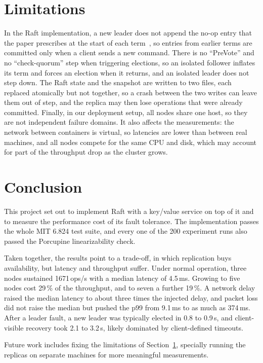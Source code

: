 \documentclass[conference]{IEEEtran}
\begin{document}
\section{Limitations}\label{sec:limits}
In the Raft implementation, a new leader does not append the no-op entry that the paper prescribes at the start of each term~\cite{raft2014},
so entries from earlier terms are committed only when a client sends a new command. There is no ``PreVote'' and no ``check-quorum'' step when triggering elections,
so an isolated follower inflates its term and forces an election when it returns, and an isolated leader does not step down. The Raft state and the snapshot are written to two files,
each replaced atomically but not together, so a crash between the two writes can leave them out of step, and the replica may then lose operations that were already committed.
Finally, in our deployment setup, all nodes share one host, so they are not independent failure domains. It also affects the measurements: the network between containers is virtual,
so latencies are lower than between real machines, and all nodes compete for the same CPU and disk, which may account for part of the throughput drop as the cluster grows.

\section{Conclusion}\label{sec:conclusion}
This project set out to implement Raft with a key/value service on top of it and to measure the performance cost of its fault tolerance.
The implementation passes the whole MIT 6.824 test suite, and every one of the 200 experiment runs also passed the Porcupine linearizability check.

Taken together, the results point to a trade-off, in which replication buys availability, but latency and throughput suffer. Under normal operation,
three nodes sustained 1671\,ops/s with a median latency of 4.5\,ms. Growing to five nodes cost 29\,\% of the throughput, and to seven a further 19\,\%.
A network delay raised the median latency to about three times the injected delay, and packet loss did not raise the median but pushed the p99 from 9.1\,ms to as much as 374\,ms.
After a leader fault, a new leader was typically elected in 0.8 to 0.9\,s, and client-visible recovery took 2.1 to 3.2\,s,
likely dominated by client-defined timeouts.

Future work includes fixing the limitations of Section~\ref{sec:limits}, specially running the replicas on separate machines for more meaningful measurements.
\end{document}
